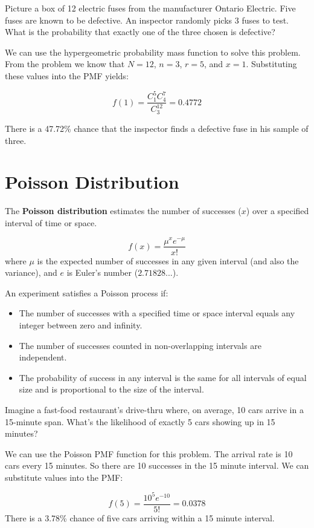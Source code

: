 \documentclass[
  11pt,
  letterpaper,
  DIV=11,
  numbers=noendperiod,
  oneside,
  open=any]{scrreprt}
\begin{document}
\begin{bsexample}[Example]

Picture a box of 12 electric fuses from the manufacturer Ontario
Electric. Five fuses are known to be defective. An inspector randomly
picks 3 fuses to test. What is the probability that exactly one of the
three chosen is defective?

We can use the hypergeometric probability mass function to solve this
problem. From the problem we know that \(N=12\), \(n=3\), \(r=5\), and
\(x=1\). Substituting these values into the PMF yields:

\[f(1)=\frac {C_1^5 C_{4}^{7}}{C_3^{12}}=0.4772\]

There is a 47.72\% chance that the inspector finds a defective fuse in
his sample of three.

\end{bsexample}

\section{Poisson Distribution}\label{poisson-distribution}

The \textbf{Poisson distribution} estimates the number of successes
(\(x\)) over a specified interval of time or space.

\begin{bsformula}

\[f(x)= \frac {\mu^{x} e^{-\mu}}{x!}\] where \(\mu\) is the expected
number of successes in any given interval (and also the variance), and
\(e\) is Euler's number (\(2.71828...\)).

\end{bsformula}

An experiment satisfies a Poisson process if:

\begin{itemize}
\item
  The number of successes with a specified time or space interval equals
  any integer between zero and infinity.
\item
  The number of successes counted in non-overlapping intervals are
  independent.
\item
  The probability of success in any interval is the same for all
  intervals of equal size and is proportional to the size of the
  interval.
\end{itemize}

\begin{bsexample}[Example]

Imagine a fast-food restaurant's drive-thru where, on average, 10 cars
arrive in a 15-minute span. What's the likelihood of exactly 5 cars
showing up in 15 minutes?

We can use the Poisson PMF function for this problem. The arrival rate
is 10 cars every 15 minutes. So there are 10 successes in the 15 minute
interval. We can substitute values into the PMF:

\[f(5)= \frac {10^{5} e^{-10}}{5!}=0.0378\] There is a 3.78\% chance of
five cars arriving within a 15 minute interval.

\end{bsexample}
\end{document}
